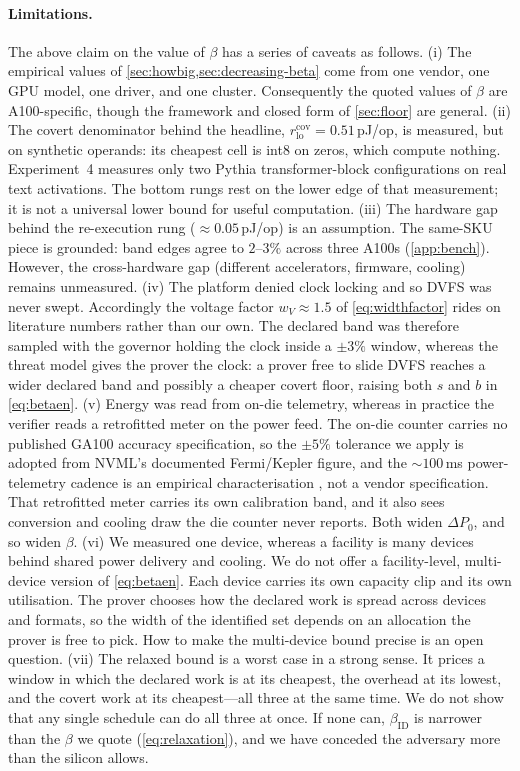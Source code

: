 \documentclass{article}
\theoremstyle{plain}
\theoremstyle{definition}
\theoremstyle{remark}
\begin{document}
\paragraph{Limitations.}
The above claim on the value of $\beta$ has a series of caveats as follows. (i) The empirical values of \cref{sec:howbig,sec:decreasing-beta} come from one vendor, one
GPU model, one driver, and one cluster. Consequently the quoted values of $\beta$ are
A100-specific, though the framework and closed form of \cref{sec:floor} are general.
(ii) The covert denominator behind the headline,
$r_{\mathrm{lo}}^{\mathrm{cov}} = 0.51$\,pJ/op, is measured, but on synthetic
operands: its cheapest cell is int8 on zeros, which compute nothing.
Experiment~4 measures only two Pythia transformer-block configurations on real
text activations. The bottom rungs rest on the lower edge of that measurement;
it is not a universal lower bound for useful computation. (iii) The hardware gap behind the
re-execution rung (${\approx}0.05$\,pJ/op) is an assumption. The same-SKU
piece is grounded: band edges agree to $2$--$3\%$ across three A100s
(\cref{app:bench}). However, the cross-hardware gap (different
accelerators, firmware, cooling) remains unmeasured. (iv) The platform denied clock locking and so DVFS was never
swept. Accordingly the voltage factor $w_V \approx 1.5$ of
\cref{eq:widthfactor} rides on literature numbers rather than our own. The
declared band was therefore sampled with the governor
holding the clock inside a $\pm 3\%$ window, whereas the threat model gives
the prover the clock: a prover free to slide DVFS reaches a wider declared
band and possibly a cheaper covert floor, raising both $s$ and $b$ in
\cref{eq:betaen}. (v) Energy was read from on-die telemetry, whereas in
practice the verifier reads a retrofitted meter on the power feed. The on-die
counter carries no published GA100 accuracy specification, so the $\pm 5\%$
tolerance we apply is adopted from NVML's documented Fermi/Kepler figure, and
the ${\sim}100$\,ms power-telemetry cadence is an empirical characterisation
\citep{yang2023parttime}, not a vendor specification. That retrofitted meter
carries its own calibration band, and it also sees conversion and cooling draw
the die counter never reports. Both widen $\Delta P_0$, and so widen $\beta$. (vi) We measured one device, whereas a facility is
many devices behind shared power delivery and cooling. We do not offer a
facility-level, multi-device version of \cref{eq:betaen}. Each
device carries its own capacity clip and its own utilisation. The
prover chooses how the declared work is spread across devices and formats, so
the width of the identified set depends on an allocation the prover is free to
pick. How to make the multi-device bound precise is an open question.
(vii) The relaxed bound is a worst case in a strong sense. It
prices a window in which the declared work is at its cheapest, the overhead at
its lowest, and the covert work at its cheapest---all three at the same time.
We do not show that any single schedule can do all three at once. If none can,
$\beta_{\mathrm{ID}}$ is narrower than the $\beta$ we quote
(\cref{eq:relaxation}), and we have conceded the adversary
more than the silicon allows.
\end{document}
